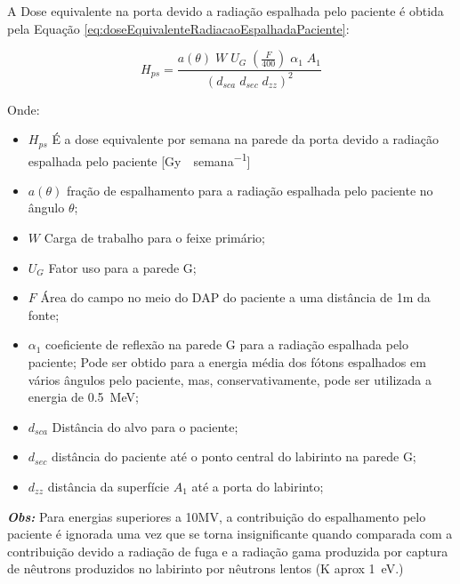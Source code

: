 \documentclass[11pt,a4paper]{article}
\begin{document}
            
            A Dose equivalente na porta devido a radiação espalhada pelo paciente é obtida pela Equação \ref{eq:doseEquivalenteRadiacaoEspalhadaPaciente}:

                \begin{equation}
                    H_{ps} = \frac{a(\theta) \; W \; U_G \; \left(\frac{F}{400}\right) \; \alpha_1 \; A_1}{\left(d_{sca} \; d_{sec} \; d_{zz}\right)^2}
                    \label{eq:doseEquivalenteRadiacaoEspalhadaPaciente}
                \end{equation}

            Onde:

                \begin{itemize}
                    \item $H_{ps}$ É a dose equivalente por semana na parede da porta devido a radiação espalhada pelo paciente [\unit{Gy \; semana^{-1}}]
                    \item $a(\theta)$   fração de espalhamento para a radiação espalhada pelo paciente no ângulo $\theta$;
                    \item $W$ Carga de trabalho para o feixe primário;
                    \item $U_G$ Fator uso para a parede G;
                    \item $F$ Área do campo no meio do DAP do paciente a uma distância de 1m da fonte;
                    \item $\alpha_1$ coeficiente de reflexão na parede G para a radiação espalhada pelo paciente; Pode ser obtido para a energia média dos fótons espalhados em vários ângulos pelo paciente, mas, conservativamente, pode ser utilizada a energia de \qty{0.5}{MeV};
                    \item $d_{sca}$ Distância do alvo para o paciente;
                    \item $d_{sec}$ distância do paciente até o ponto central do labirinto na parede G;
                    \item $d_{zz}$ distância da superfície $A_1$ até a porta do labirinto;
                \end{itemize} 
            
            \textbf{\textit{\textcolor{CarnationPink}{Obs:}}} Para energias superiores a 10MV, a contribuição do espalhamento pelo paciente é ignorada uma vez que se torna insignificante quando comparada com a contribuição devido a radiação de fuga e a radiação gama produzida por captura de nêutrons produzidos no labirinto por nêutrons lentos (K aprox \qty{1}{eV}.)
\end{document}
